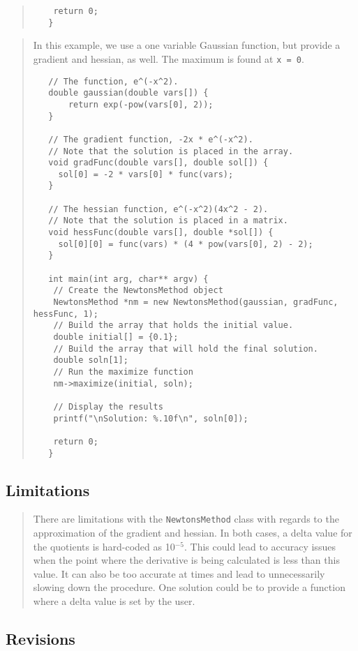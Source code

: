 \documentclass[10pt]{article}%
\begin{document}
\begin{quotation}
{{\begin{verbatim}
    return 0;
   }
  \end{verbatim}
}}
\end{quotation}\begin{quotation} In this example, we use a one variable Gaussian function, but provide a gradient and hessian, as well. The maximum is found at \texttt{x = 0}.{\small{\begin{verbatim} 
   // The function, e^(-x^2).
   double gaussian(double vars[]) {
       return exp(-pow(vars[0], 2));
   }

   // The gradient function, -2x * e^(-x^2).
   // Note that the solution is placed in the array.
   void gradFunc(double vars[], double sol[]) {
     sol[0] = -2 * vars[0] * func(vars);
   }

   // The hessian function, e^(-x^2)(4x^2 - 2).
   // Note that the solution is placed in a matrix.
   void hessFunc(double vars[], double *sol[]) {
     sol[0][0] = func(vars) * (4 * pow(vars[0], 2) - 2);
   }

   int main(int arg, char** argv) {
    // Create the NewtonsMethod object
    NewtonsMethod *nm = new NewtonsMethod(gaussian, gradFunc, hessFunc, 1);
    // Build the array that holds the initial value.
    double initial[] = {0.1};
    // Build the array that will hold the final solution.
    double soln[1];
    // Run the maximize function
    nm->maximize(initial, soln);

    // Display the results
    printf("\nSolution: %.10f\n", soln[0]);

    return 0;
   }
  \end{verbatim}
}}
\end{quotation}
\subsection*{Limitations}

\begin{quotation} There are limitations with the \texttt{NewtonsMethod} class with regards to the approximation of the gradient and hessian. In both cases, a delta value for the quotients is hard-coded as 10\(^{-5}\). This could lead to accuracy issues when the point where the derivative is being calculated is less than this value. It can also be too accurate at times and lead to unnecessarily slowing down the procedure. One solution could be to provide a function where a delta value is set by the user.\end{quotation}

\subsection*{Revisions}
\end{document}
